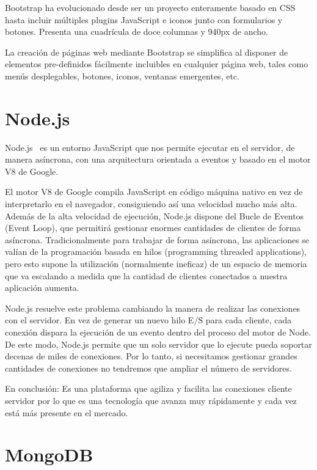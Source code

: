 \documentclass[a4paper, 12pt]{book}
\begin{document}
	Bootstrap ha evolucionado desde ser un proyecto enteramente basado en CSS hasta incluir múltiples plugins JavaScript e iconos junto con formularios y botones. Presenta una cuadrícula de doce columnas y 940px de ancho.

	La creación de páginas web mediante Bootstrap se simplifica al disponer de elementos pre-definidos fácilmente incluibles en cualquier página web, tales como menús desplegables, botones, iconos, ventanas emergentes, etc.

\section{Node.js} 
\label{sec:Node}
	Node.js~\cite{node}  es un entorno JavaScript que nos permite ejecutar en el servidor, de manera asíncrona, con una arquitectura orientada a eventos y basado en el motor V8 de Google.
	
	El motor V8 de Google compila JavaScript en código máquina nativo en vez de interpretarlo en el navegador, consiguiendo así una velocidad mucho más alta. Además de la alta velocidad de ejecución, Node.js dispone del Bucle de Eventos (Event Loop), que permitirá gestionar enormes cantidades de clientes de forma asíncrona. Tradicionalmente para trabajar de forma asíncrona, las aplicaciones se valían de la programación basada en hilos (programming threaded applications), pero esto supone la utilización (normalmente ineficaz) de un espacio de memoria que va escalando a medida que la cantidad de clientes conectados a nuestra aplicación aumenta.
	
	Node.js resuelve este problema cambiando la manera de realizar las conexiones con el servidor. En vez de generar un nuevo hilo E/S para cada cliente, cada conexión dispara la ejecución de un evento dentro del proceso del motor de Node. De este modo, Node.js permite que un solo servidor que lo ejecute pueda soportar decenas de miles de conexiones. Por lo tanto, si necesitamos gestionar grandes cantidades de conexiones no tendremos que ampliar el número de servidores.

	En conclusión: Es una plataforma que agiliza y facilita las conexiones cliente servidor por lo que es una tecnología que avanza muy rápidamente y cada vez está más presente en el mercado.

\section{MongoDB} 
\label{sec:MongoDB}
\end{document}
